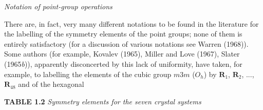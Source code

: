 \documentclass[11pt,a4paper,twoside,openright]{book}
\begin{document}
\textit{Notation of point-group operations}

There are, in fact, very many different notations to be found in the literature for the labelling of the symmetry elements of the point groups; none of them is entirely satisfactory (for a discussion of various notations see Warren (1968)). Some authors (for example, Kovalev (1965), Miller and Love (1967), Slater (1965\textit{b})), apparently disconcerted by this lack of uniformity, have taken, for example, to labelling the elements of the cubic group $m3m$ ($O_{h}$) by $\mathbf{R}_{1}$, $\mathbf{R}_{2}$, ..., $\mathbf{R}_{48}$ and of the hexagonal

\begin{minipage}{\textwidth}
\centering\textbf{TABLE 1.2}
\textit{Symmetry elements for the seven crystal systems}

\noindent{}
\end{minipage}
\medskip
\end{document}
